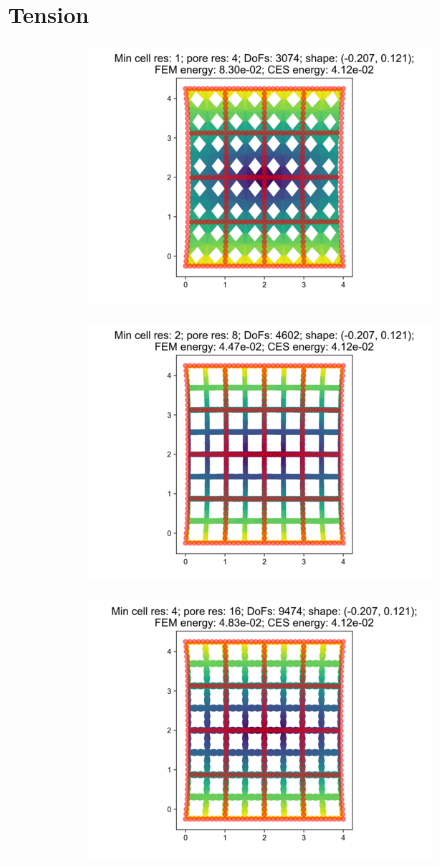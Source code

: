 \clearpage

\subsection{Tension}

\begin{figure}[H]
\begin{subfigure}{.45\textwidth}
  \centering
  \includegraphics[width=.8\linewidth]{lces/vis_tension/bm_0_mesh_0.png}
\end{subfigure}
\begin{subfigure}{.45\textwidth}
  \centering
  \includegraphics[width=.8\linewidth]{lces/vis_tension/bm_0_mesh_1.png}
\end{subfigure}
\newline
\begin{subfigure}{.45\textwidth}
  \centering
  \includegraphics[width=.8\linewidth]{lces/vis_tension/bm_0_mesh_2.png}

\end{subfigure}
\end{figure}
